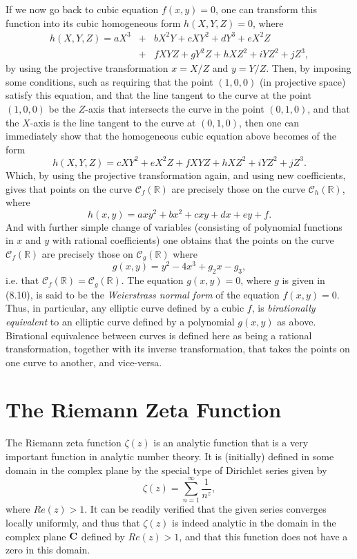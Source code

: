 \documentclass[12pt,letterpaper]{book}
\begin{document}
If we now go back to cubic equation $f(x,y)=0$, one can transform
this function into its cubic homogeneous form $h(X,Y,Z)=0$, where
\begin{eqnarray}
h(X,Y,Z)=aX^3&+&bX^2Y+cXY^2+dY^3+eX^2Z\nonumber\\&+&fXYZ+gY^2Z+hXZ^2+iYZ^2+jZ^3,
\end{eqnarray}
by using the projective transformation $x=X/Z$ and $y=Y/Z$. Then, by
imposing some conditions, such as requiring that the point $(1,0,0)$
(in projective space) satisfy this equation, and that the line
tangent to the curve at the point $(1,0,0)$ be the $Z$-axis that
intersects the curve in the point $(0,1,0)$, and that the $X$-axis
is the line tangent to the curve at $(0,1,0)$, then one can
immediately show that the homogeneous cubic equation above becomes
of the form
\begin{equation}
h(X,Y,Z)=cXY^2+eX^2Z+fXYZ+hXZ^2+iYZ^2+jZ^3.
\end{equation}
Which, by using the projective transformation again, and using new
coefficients, gives that points on the curve
$\mathscr{C}_f(\mathbb{R})$ are precisely those on the curve
$\mathscr{C}_h(\mathbb{R})$, where
\begin{equation}
h(x,y)=axy^2+bx^2+cxy+dx+ey+f.
\end{equation}
And with further simple change of variables (consisting of
polynomial functions in $x$ and $y$ with rational coefficients) one
obtains that the points on the curve $\mathscr{C}_f(\mathbb{R})$ are
precisely those on $\mathscr{C}_g(\mathbb{R})$ where
\begin{equation}
g(x,y)=y^2-4x^3+g_2x-g_3,
\end{equation}
i.e. that $\mathscr{C}_f(\mathbb{R})=\mathscr{C}_g(\mathbb{R})$. The
equation $g(x,y)=0$, where $g$ is given in (8.10), is said to be the
{\it Weierstrass normal form} of the equation $f(x,y)=0$. Thus, in
particular, any elliptic curve defined by a cubic $f$, is {\it
birationally equivalent} to an elliptic curve defined by a
polynomial $g(x,y)$ as above. Birational equivalence between curves
is defined here as being a rational transformation, together with
its inverse transformation, that takes the points on one curve to
another, and vice-versa.


\section{The Riemann Zeta Function}
 The Riemann zeta function $\zeta(z)$
is an analytic function that is a very important function in
analytic number theory. It is (initially) defined in some domain in
the complex plane by the special type of Dirichlet series given by
\begin{equation}
\zeta(z)=\sum_{n=1}^{\infty}\frac{1}{n^z},
\end{equation}
where $Re(z)>1$. It can be readily verified that the given series
converges locally uniformly, and thus that $\zeta(z)$ is indeed
analytic in the domain in the complex plane $\bf C$ defined by
$Re(z)>1$, and that this function does not have a zero in this
domain.
\end{document}
